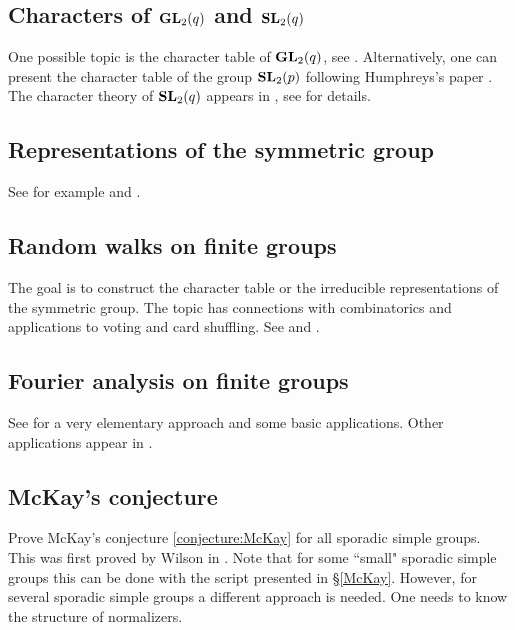 \subsection*{Characters of $\mathbf{GL}_2(q)$ and $\mathbf{SL}_2(q)$}

One possible topic is the character table of $\mathbf{GL}_2(q)$, see
\cite[\S5.2]{MR2867444}. Alternatively, one can 
present the character table of the group $\mathbf{SL}_2(p)$  
following Humphreys's paper \cite{MR364478}. 
The character theory of $\mathbf{SL}_2(q)$ appears in 
\cite[\S5.2]{MR2867444}, see 
\cite[Chapter 20]{MR1650707} for details. 

\subsection*{Representations of the symmetric group}

See for example \cite[\S10]{MR2867444} and 
\cite{MR1153249}. 

\subsection*{Random walks on finite groups}

The goal is to construct the character table or 
the irreducible representations of the symmetric group. 
The topic has connections with combinatorics and applications 
to voting and card shuffling. 
See \cite[4]{MR1153249} and \cite[\S11]{MR2867444}.

\subsection*{Fourier analysis on finite groups}

See \cite[\S5]{MR2867444} for a very elementary approach and some
basic applications. Other applications 
appear in \cite{MR1695775}.

\subsection*{McKay's conjecture}

Prove McKay's conjecture \ref{conjecture:McKay} for all sporadic simple groups. 
This was first proved by Wilson in \cite{MR1643110}. 
Note that
for some ``small" sporadic simple groups this can be done
with the script presented in \S\ref{McKay}. However, 
for several sporadic simple groups a different approach is needed. One needs
to know the structure of normalizers. 

